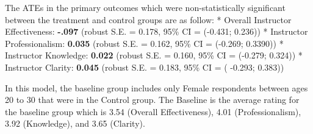 \documentclass[
]{article}
\begin{document}
The ATEs in the primary outcomes which were non-statistically
significant between the treatment and control groups are as follow: *
Overall Instructor Effectiveness: \textbf{-.097} (robust S.E. = 0.178,
95\% CI = (-0.431; 0.236)) * Instructor Professionalism: \textbf{0.035}
(robust S.E. = 0.162, 95\% CI = (-0.269; 0.3390)) * Instructor
Knowledge: \textbf{0.022} (robust S.E. = 0.160, 95\% CI = (-0.279;
0.324)) * Instructor Clarity: \textbf{0.045} (robust S.E. = 0.183, 95\%
CI = ( -0.293; 0.383))

In this model, the baseline group includes only Female respondents
between ages 20 to 30 that were in the Control group. The Baseline is
the average rating for the baseline group which is 3.54 (Overall
Effectiveness), 4.01 (Professionalism), 3.92 (Knowledge), and 3.65
(Clarity).

\clearpage
\end{document}
